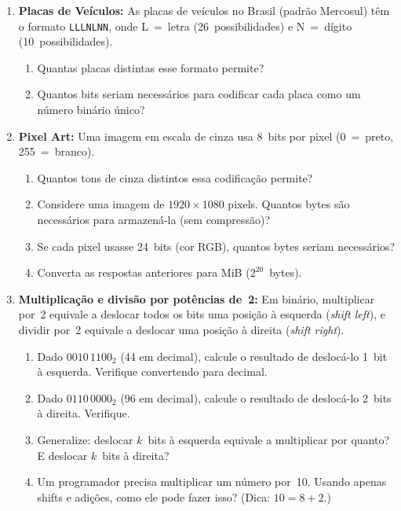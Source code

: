 \documentclass[11pt, a4paper]{article}
\begin{document}
\begin{enumerate}
\item \textbf{Placas de Ve\'{i}culos:} As placas de ve\'{i}culos no Brasil (padr\~{a}o Mercosul) t\^{e}m o formato \texttt{LLLNLNN}, onde L~=~letra (26~possibilidades) e N~=~d\'{i}gito (10~possibilidades).
\begin{enumerate}
  \item Quantas placas distintas esse formato permite?
  \item Quantos bits seriam necess\'{a}rios para codificar cada placa como um n\'{u}mero bin\'{a}rio \'{u}nico?
\end{enumerate}

\item \textbf{Pixel Art:} Uma imagem em escala de cinza usa 8~bits por pixel (0~=~preto, 255~=~branco).
\begin{enumerate}
  \item Quantos tons de cinza distintos essa codifica\c{c}\~{a}o permite?
  \item Considere uma imagem de $1920 \times 1080$ pixels. Quantos bytes s\~{a}o necess\'{a}rios para armazen\'{a}-la (sem compress\~{a}o)?
  \item Se cada pixel usasse 24~bits (cor RGB), quantos bytes seriam necess\'{a}rios?
  \item Converta as respostas anteriores para MiB ($2^{20}$~bytes).
\end{enumerate}
\item \textbf{Multiplica\c{c}\~{a}o e divis\~{a}o por pot\^{e}ncias de~2:} Em bin\'{a}rio, multiplicar por~2 equivale a deslocar todos os bits uma posi\c{c}\~{a}o \`{a} esquerda (\emph{shift left}), e dividir por~2 equivale a deslocar uma posi\c{c}\~{a}o \`{a} direita (\emph{shift right}).
\begin{enumerate}
  \item Dado $0010\,1100_2$ (44 em decimal), calcule o resultado de desloc\'{a}-lo 1~bit \`{a} esquerda. Verifique convertendo para decimal.
  \item Dado $0110\,0000_2$ (96 em decimal), calcule o resultado de desloc\'{a}-lo 2~bits \`{a} direita. Verifique.
  \item Generalize: deslocar $k$~bits \`{a} esquerda equivale a multiplicar por quanto? E deslocar $k$~bits \`{a} direita?
  \item Um programador precisa multiplicar um n\'{u}mero por~10. Usando apenas shifts e adi\c{c}\~{o}es, como ele pode fazer isso? (Dica: $10 = 8 + 2$.)
\end{enumerate}


\end{enumerate}
\end{document}
